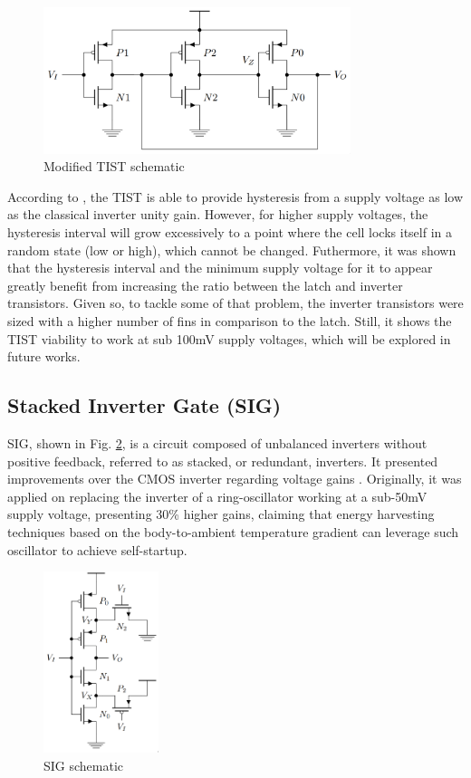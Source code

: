 \documentclass[diss,pgmicro,english]{iiufrgs}
\begin{document}
\begin{figure}[t]
  \centering
    \includegraphics[width=0.8\textwidth, trim={0cm 0cm 0cm 0cm}, clip]{TIST.png}
     \caption{Modified TIST schematic \cite{rabaey2003digital}}
  \label{fig:TIST}
\end{figure}

According to \cite{thiagoTIST}, the TIST is able to provide hysteresis from a supply voltage as low as the classical inverter unity gain. However, for higher supply voltages, the hysteresis interval will grow excessively to a point where the cell locks itself in a random state (low or high), which cannot be changed. Futhermore, it was shown that the hysteresis interval and the minimum supply voltage for it to appear greatly benefit from increasing the ratio between the latch and inverter transistors. Given so, to tackle some of that problem, the inverter transistors were sized with a higher number of fins in comparison to the latch. Still, it shows the TIST viability to work at sub 100mV supply voltages, which will be explored in future works.

\subsection{Stacked Inverter Gate (SIG)}

SIG, shown in Fig. \ref{fig:SIG}, is a circuit composed of unbalanced inverters without positive feedback, referred to as stacked, or redundant, inverters. It presented improvements over the CMOS inverter regarding voltage gains \cite{bose2018stacked, luo2017sub}. Originally, it was applied on replacing the inverter of a ring-oscillator working at a sub-50mV supply voltage, presenting 30\% higher gains, claiming that energy harvesting techniques based on the body-to-ambient temperature gradient can leverage such oscillator to achieve self-startup.

\begin{figure}[]
  \centering
    \includegraphics[width=0.3\textwidth]{SIG.png}
     \caption{SIG schematic \cite{bose2018stacked}}
  \label{fig:SIG}
\end{figure}
\end{document}
